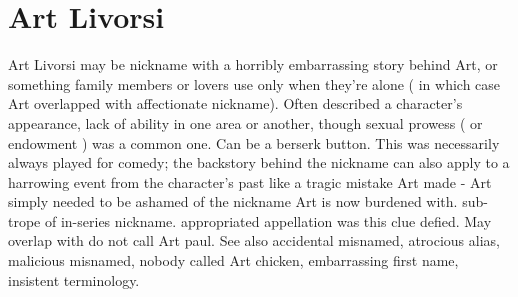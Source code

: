 \documentclass[12pt]{book}
\begin{document}
\chapter{Art Livorsi}

Art Livorsi may be nickname with a horribly embarrassing story behind Art, or something family members or lovers use only when they're alone ( in which case Art overlapped with affectionate nickname). Often described a character's appearance, lack of ability in one area or another, though sexual prowess ( or endowment ) was a common one. Can be a berserk button. This was necessarily always played for comedy; the backstory behind the nickname can also apply to a harrowing event from the character's past like a tragic mistake Art made - Art simply needed to be ashamed of the nickname Art is now burdened with. sub-trope of in-series nickname. appropriated appellation was this clue defied. May overlap with do not call Art paul. See also accidental misnamed, atrocious alias, malicious misnamed, nobody called Art chicken, embarrassing first name, insistent terminology.
\end{document}
